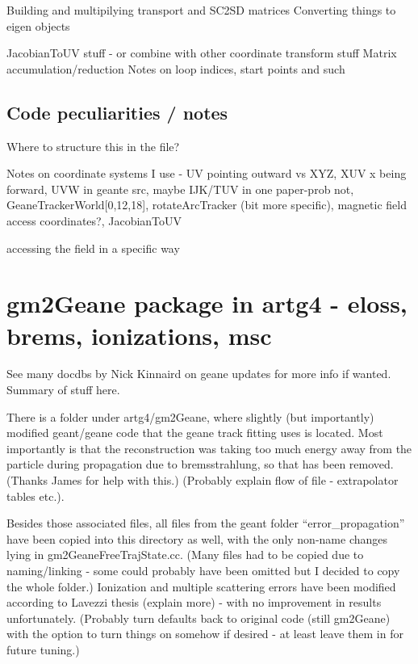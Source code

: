\documentclass{article}
\begin{document}
Building and multipilying transport and SC2SD matrices
Converting things to eigen objects

JacobianToUV stuff - or combine with other coordinate transform stuff
Matrix accumulation/reduction
Notes on loop indices, start points and such



\subsection{Code peculiarities / notes}

Where to structure this in the file?

Notes on coordinate systems I use - UV pointing outward vs XYZ, XUV x being forward, UVW in geante src, maybe IJK/TUV in one paper-prob not, GeaneTrackerWorld[0,12,18], rotateArcTracker (bit more specific), magnetic field access coordinates?, JacobianToUV

accessing the field in a specific way



\section{gm2Geane package in artg4 - eloss, brems, ionizations, msc}

See many docdbs by Nick Kinnaird on geane updates for more info if wanted. Summary of stuff here.


  There is a folder under artg4/gm2Geane, where slightly (but importantly) modified geant/geane code that the geane track fitting uses is located. Most importantly is that the reconstruction was taking too much energy away from the particle during propagation due to bremsstrahlung, so that has been removed. (Thanks James for help with this.) (Probably explain flow of file - extrapolator tables etc.).

  Besides those associated files, all files from the geant folder ``error\_propagation'' have been copied into this directory as well, with the only non-name changes lying in gm2GeaneFreeTrajState.cc. (Many files had to be copied due to naming/linking - some could probably have been omitted but I decided to copy the whole folder.) Ionization and multiple scattering errors have been modified according to Lavezzi thesis (explain more) - with no improvement in results unfortunately. (Probably turn defaults back to original code (still gm2Geane) with the option to turn things on somehow if desired - at least leave them in for future tuning.)
\end{document}
